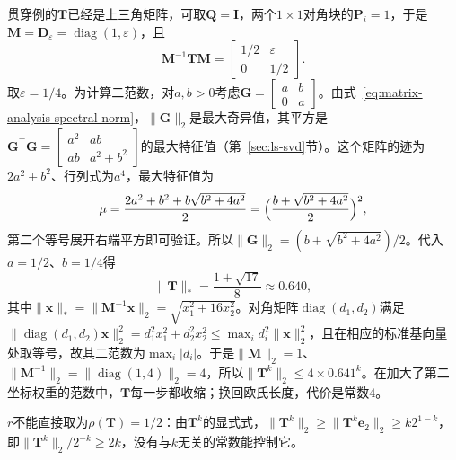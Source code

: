 \begin{example}[贯穿例的坐标范数]
\label{ex:ls-coordinate-norm-contraction}
贯穿例的$\bm T$已经是上三角矩阵，可取$\bm Q=\bm I$，两个$1\times1$对角块的$\bm P_i=1$，于是$\bm M=\bm D_\varepsilon=\operatorname{diag}(1,\varepsilon)$，且
\[
 \bm M^{-1}\bm T\bm M=\begin{bmatrix}1/2&\varepsilon\\0&1/2\end{bmatrix}.
\]
取$\varepsilon=1/4$。为计算二范数，对$a,b>0$考虑$\bm G=\left[\begin{smallmatrix}a&b\\0&a\end{smallmatrix}\right]$。由式~\eqref{eq:matrix-analysis-spectral-norm}，$\lVert\bm G\rVert_2$是最大奇异值，其平方是$\bm G^\top\bm G=\left[\begin{smallmatrix}a^2&ab\\ab&a^2+b^2\end{smallmatrix}\right]$的最大特征值（第~\ref{sec:ls-svd}节）。这个矩阵的迹为$2a^2+b^2$、行列式为$a^4$，最大特征值为
\[
 \mu=\frac{2a^2+b^2+b\sqrt{b^2+4a^2}}{2}=\Bigl(\frac{b+\sqrt{b^2+4a^2}}{2}\Bigr)^2,
\]
第二个等号展开右端平方即可验证。所以$\lVert\bm G\rVert_2=(b+\sqrt{b^2+4a^2})/2$。代入$a=1/2$、$b=1/4$得
\[
 \lVert\bm T\rVert_*=\frac{1+\sqrt{17}}{8}\approx0.640,
\]
其中$\lVert\bm x\rVert_*=\lVert\bm M^{-1}\bm x\rVert_2=\sqrt{x_1^2+16x_2^2}$。对角矩阵$\operatorname{diag}(d_1,d_2)$满足$\lVert\operatorname{diag}(d_1,d_2)\bm x\rVert_2^2=d_1^2x_1^2+d_2^2x_2^2\leq\max_id_i^2\lVert\bm x\rVert_2^2$，且在相应的标准基向量处取等号，故其二范数为$\max_i|d_i|$。于是$\lVert\bm M\rVert_2=1$、$\lVert\bm M^{-1}\rVert_2=\lVert\operatorname{diag}(1,4)\rVert_2=4$，所以$\lVert\bm T^k\rVert_2\leq4\times0.641^k$。在加大了第二坐标权重的范数中，$\bm T$每一步都收缩；换回欧氏长度，代价是常数$4$。

$r$不能直接取为$\rho(\bm T)=1/2$：由$\bm T^k$的显式式，$\lVert\bm T^k\rVert_2\geq\lVert\bm T^k\bm e_2\rVert_2\geq k2^{1-k}$，即$\lVert\bm T^k\rVert_2/2^{-k}\geq2k$，没有与$k$无关的常数能控制它。
\end{example}

